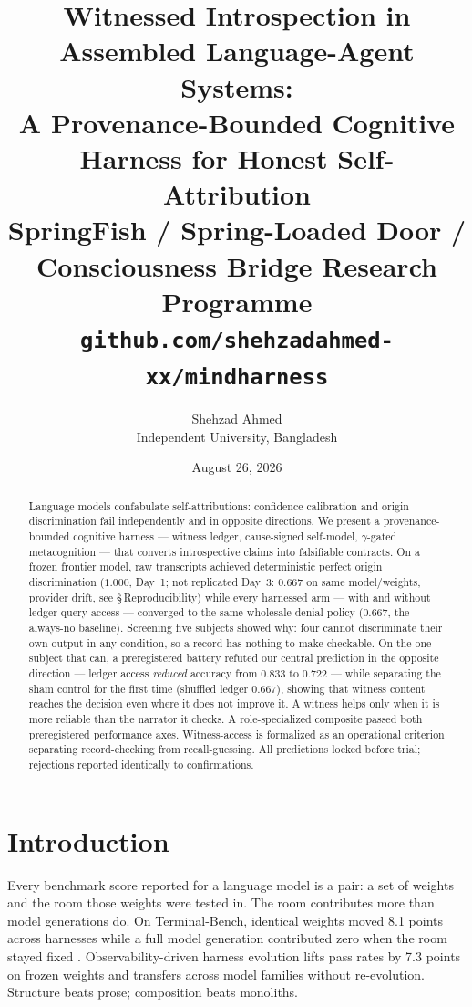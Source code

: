 \documentclass[11pt]{article}
\title{Witnessed Introspection in Assembled Language-Agent Systems:\\[4pt]
\Large A Provenance-Bounded Cognitive Harness for Honest Self-Attribution\\[8pt]
\normalsize SpringFish / Spring-Loaded Door / Consciousness Bridge Research Programme\\
\texttt{github.com/\allowbreak{}shehzadahmed-\allowbreak{}xx/\allowbreak{}mindharness}}
\author{Shehzad Ahmed \\ \small Independent University, Bangladesh}
\date{August 26, 2026}
\begin{document}
\maketitle

\begin{abstract}
Language models confabulate self-attributions: confidence calibration and
origin discrimination fail independently and in opposite directions.
We present a provenance-bounded cognitive harness --- witness ledger,
cause-signed self-model, $\gamma$-gated metacognition --- that converts
introspective claims into falsifiable contracts. On a frozen frontier
model, raw transcripts achieved deterministic perfect origin
discrimination ($1.000$, Day~1; not replicated Day~3: $0.667$ on same model/weights, provider drift, see \S\,Reproducibility) while every harnessed arm --- with and without
ledger query access --- converged to the same wholesale-denial policy
($0.667$, the always-no baseline). Screening five subjects showed why:
four cannot discriminate their own output in any condition, so a record
has nothing to make checkable. On the one subject that can, a
preregistered battery refuted our central prediction in the opposite
direction --- ledger access \emph{reduced} accuracy from $0.833$ to
$0.722$ --- while separating the sham control for the first time
(shuffled ledger $0.667$), showing that witness content reaches the
decision even where it does not improve it. A witness helps only when it
is more reliable than the narrator it checks. A role-specialized composite passed both
preregistered performance axes. Witness-access is formalized as an
operational criterion separating record-checking from recall-guessing.
All predictions locked before trial; rejections reported identically to
confirmations.
\end{abstract}

\section{Introduction}\label{sec:intro}

Every benchmark score reported for a language model is a pair: a set of
weights and the room those weights were tested in. The room contributes
more than model generations do. On Terminal-Bench, identical weights moved
8.1 points across harnesses while a full model generation contributed zero
when the room stayed fixed \citep{lin2026ahe}. Observability-driven harness
evolution lifts pass rates by 7.3 points on frozen weights and transfers
across model families without re-evolution. Structure beats prose;
composition beats monoliths.
\end{document}
